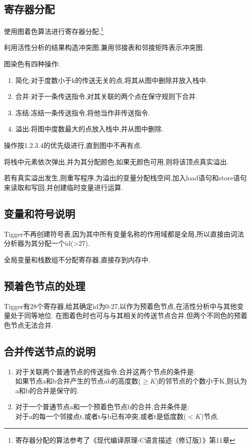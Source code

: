 \documentclass[UTF8]{article}
\begin{document}
\subsection{寄存器分配}
使用图着色算法进行寄存器分配.\footnote{寄存器分配的算法参考了《现代编译原理-C语言描述（修订版）》第11章}

利用活性分析的结果构造冲突图,兼用邻接表和邻接矩阵表示冲突图.

图染色有四种操作:
\begin{enumerate}[1.]
\item 简化:对于度数小于k的传送无关的点,将其从图中删除并放入栈中.
\item 合并:对于一条传送指令,对其关联的两个点在保守规则下合并.
\item 冻结:冻结一条传送指令,将他当作非传送指令.
\item 溢出:将图中度数最大的点放入栈中,并从图中删除.
\end{enumerate}
操作按1.2.3.4的优先级进行,直到图中不再有点.

将栈中元素依次弹出,并为其分配颜色,如果无颜色可用,则将该顶点真实溢出.

若有真实溢出发生,则重写程序,为溢出的变量分配栈空间,加入load语句和store语句来读取和写回,并创建临时变量进行运算.
\subsection{变量和符号说明}
Tigger不再创建符号表,因为其中所有变量名称的作用域都是全局,所以直接由词法分析器为其分配一个id(>27).

全局变量和栈数组不分配寄存器,直接存到内存中.
\subsection{预着色节点的处理}
Tigger有28个寄存器,给其确定id为0-27,以作为预着色节点,在活性分析中与其他变量处于同等地位. 在图着色时也可与与其相关的传送节点合并.但两个不同色的预着色节点无法合并.
\subsection{合并传送节点的说明}
\begin{enumerate}
\item 对于关联两个普通节点的传送指令,合并这两个节点的条件是:\\如果节点a和b合并产生的节点ab的高度数($\ge K$)的邻节点的个数小于K,则认为a和b的合并是保守的.
\item 对于一个普通节点a和一个预着色节点b的合并,合并条件是:\\对于a的每一个邻接点t,或者t与b已有冲突,或者t是低度数($<K$)节点.
\end{enumerate}
\end{document}
